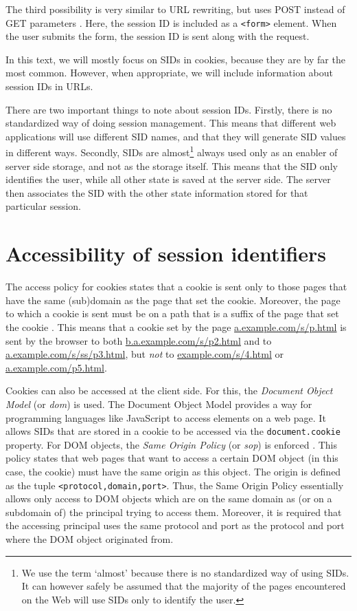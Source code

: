 The third possibility is very similar to URL rewriting, but uses POST instead of GET parameters \cite{Johns2006}. Here, the session ID is included as a \texttt{<form>} element. When the user submits the form, the session ID is sent along with the request.

In this text, we will mostly focus on SIDs in cookies, because they are by far the most common. However, when appropriate, we will include information about session IDs in URLs.

There are two important things to note about session IDs. Firstly, there is no standardized way of doing session management. This means that different web applications will use different SID names, and that they will generate SID values in different ways. Secondly, SIDs are almost\footnote{We use the term `almost' because there is no standardized way of using SIDs. It can however safely be assumed that the majority of the pages encountered on the Web will use SIDs only to identify the user.} always used only as an enabler of server side storage, and not as the storage itself. This means that the SID only identifies the user, while all other state is saved at the server side. The server then associates the SID with the other state information stored for that particular session.

\section{Accessibility of session identifiers}

\label{access-control}\label{sop}The access policy for cookies states that a cookie is sent only to those pages that have the same (sub)domain as the page that set the cookie. Moreover, the page to which a cookie is sent must be on a path that is a suffix of the page that set the cookie \cite{Singh2010}. This means that a cookie set by the page \url{a.example.com/s/p.html} is sent by the browser to both \url{b.a.example.com/s/p2.html} and to \url{a.example.com/s/ss/p3.html}, but \emph{not} to \url{example.com/s/4.html} or \url{a.example.com/p5.html}.

Cookies can also be accessed at the client side. For this, the \emph{Document Object Model} (or \emph{\gls{dom}}) is used. The Document Object Model provides a way for programming languages like JavaScript to access elements on a web page. It allows SIDs that are stored in a cookie to be accessed via the \texttt{document.cookie} property. For DOM objects, the \emph{Same Origin Policy} (or \emph{\gls{sop}}) is enforced \cite{Singh2010}. This policy states that web pages that want to access a certain DOM object (in this case, the cookie) must have the same origin as this object. The origin is defined as the tuple \texttt{<protocol,domain,port>}. Thus, the Same Origin Policy essentially allows only access to DOM objects which are on the same domain as (or on a subdomain of) the principal trying to access them. Moreover, it is required that the accessing principal uses the same protocol and port as the protocol and port where the DOM object originated from.

